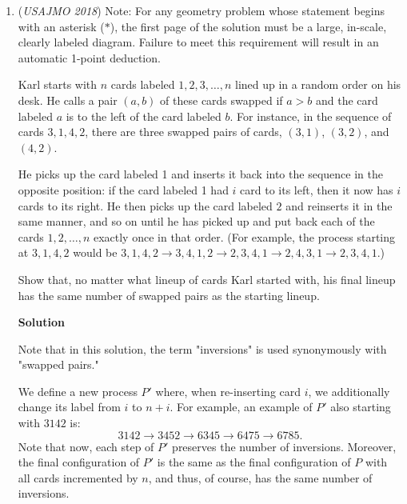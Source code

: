 \begin{enumerate}
 These $p$ graphs together have exactly one edge for every unordered pair of elements of $\{1, 2, ..., p\},$ so they have a total of exactly $\frac{p(p-1)}{2}$ edges. Therefore, there exists at least one graph $G_k$ that has strictly fewer than $\frac{p}{2}$ edges, meaning that it has more than $\frac{p}{2}$ disconnected components. Therefore, the collection of numbers $\{a_i + ik: 1\le i\le p\}$ for this particular value of $k$ has at least $\frac{p}{2}$ distinct remainders modulo $p.$ This completes the proof.

 (sujaykazi)

 


	\item (\textit{USAJMO 2018}) Note: For any geometry problem whose statement begins with an asterisk ($*$), the first page of the solution must be a large, in-scale, clearly labeled diagram. Failure to meet this requirement will result in an automatic 1-point deduction. 


 Karl starts with $n$ cards labeled $1,2,3,\dots,n$ lined up in a random order on his desk. He calls a pair $(a,b)$ of these cards swapped if $a>b$ and the card labeled $a$ is to the left of the card labeled $b$. For instance, in the sequence of cards $3,1,4,2$, there are three swapped pairs of cards, $(3,1)$, $(3,2)$, and $(4,2)$.


 He picks up the card labeled 1 and inserts it back into the sequence in the opposite position: if the card labeled 1 had $i$ card to its left, then it now has $i$ cards to its right. He then picks up the card labeled $2$ and reinserts it in the same manner, and so on until he has picked up and put back each of the cards $1,2,\dots,n$ exactly once in that order. (For example, the process starting at $3,1,4,2$ would be $3,1,4,2\to 3,4,1,2\to 2,3,4,1\to 2,4,3,1\to 2,3,4,1$.)


 Show that, no matter what lineup of cards Karl started with, his final lineup has the same number of swapped pairs as the starting lineup.


 



\textbf{Solution}

Note that in this solution, the term "inversions" is used synonymously with "swapped pairs."

 We define a new process $P'$ where, when re-inserting card $i$, we additionally change its label from $i$ to $n+i$. For example, an example of $P'$ also starting with $3142$ is:
 \[3142 \longrightarrow 3452 \longrightarrow 6345 \longrightarrow 6475 \longrightarrow 6785.\]Note that now, each step of $P'$ preserves the number of inversions. Moreover, the final configuration of $P'$ is the same as the final configuration of $P$ with all cards incremented by $n$, and thus, of course, has the same number of inversions.

 


\end{enumerate}
